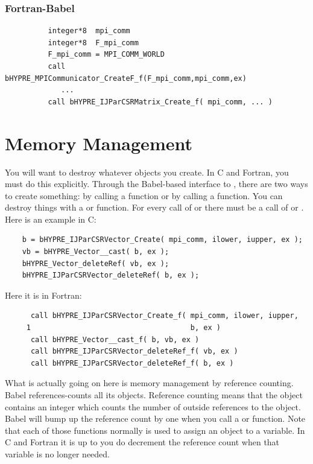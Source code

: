 \subsubsection{Fortran-Babel}
\begin{verbatim}
          integer*8  mpi_comm
          integer*8  F_mpi_comm
          F_mpi_comm = MPI_COMM_WORLD
          call bHYPRE_MPICommunicator_CreateF_f(F_mpi_comm,mpi_comm,ex)
             ...
          call bHYPRE_IJParCSRMatrix_Create_f( mpi_comm, ... )
\end{verbatim}

\section{Memory Management}

You will want to destroy whatever objects you create.  In C and
Fortran, you must do this explicitly.  Through the Babel-based
interface to \hypre{}, there are two ways to create something: by
calling a  function or by calling a
 function. You can destroy things with a 
or  function.  For every call of  or
 there must be a call of  or
.  Here is an example in C:
\begin{verbatim}
    b = bHYPRE_IJParCSRVector_Create( mpi_comm, ilower, iupper, ex );
    vb = bHYPRE_Vector__cast( b, ex );
    bHYPRE_Vector_deleteRef( vb, ex );
    bHYPRE_IJParCSRVector_deleteRef( b, ex );
\end{verbatim}
Here it is in Fortran:
\begin{verbatim}
      call bHYPRE_IJParCSRVector_Create_f( mpi_comm, ilower, iupper,
     1                                     b, ex )
      call bHYPRE_Vector__cast_f( b, vb, ex )
      call bHYPRE_IJParCSRVector_deleteRef_f( vb, ex )
      call bHYPRE_IJParCSRVector_deleteRef_f( b, ex )
\end{verbatim}

What is actually going on here is memory management by reference
counting.  Babel references-counts all its objects.  Reference
counting means that the object contains an integer which counts the
number of outside references to the object.  Babel will bump up the
reference count by one when you call a  or 
function.  Note that each of those functions normally is used to
assign an object to a variable.  In C and Fortran it is up to you do
decrement the reference count when that variable is no longer needed.

